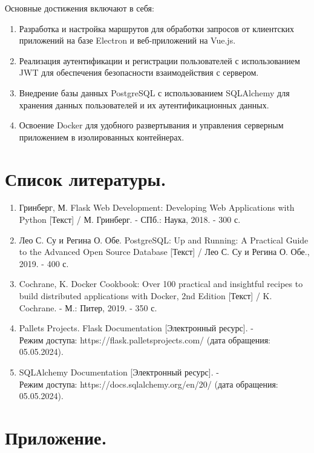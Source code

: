 \documentclass[12pt, russian]{extarticle}
\begin{document}
\begin{spacing}{1.5}
    Основные достижения включают в себя:

    \begin{enumerate}
        \item Разработка и настройка маршрутов для обработки запросов от клиентских приложений
            на базе Electron и веб-приложений на Vue.js.
        \item Реализация аутентификации и регистрации пользователей с использованием JWT
            для обеспечения безопасности взаимодействия с сервером.
        \item Внедрение базы данных PostgreSQL с использованием SQLAlchemy для хранения
            данных пользователей и их аутентификационных данных.
        \item Освоение Docker для удобного развертывания и управления серверным приложением
            в изолированных контейнерах.
    \end{enumerate}

    \newpage
    \section{Список литературы.}

    \begin{enumerate}
        \item Гринберг, М. Flask Web Development: Developing Web Applications with Python [Текст] / М. Гринберг. - СПб.: Наука, 2018. - 300 с.
        \item Лео С. Су и Регина О. Обе. PostgreSQL: Up and Running: A Practical Guide to the Advanced Open Source Database [Текст] / Лео С. Су и Регина О. Обе., 2019. - 400 с.
        \item Cochrane, K. Docker Cookbook: Over 100 practical and insightful recipes to build distributed applications with Docker, 2nd Edition [Текст] / K. Cochrane. - М.: Питер, 2019. - 350 с.
        \item Pallets Projects. Flask Documentation [Электронный ресурс]. - \\
            Режим доступа: https://flask.palletsprojects.com/ (дата обращения: 05.05.2024).
        \item SQLAlchemy Documentation [Электронный ресурс]. - \\
            Режим доступа: https://docs.sqlalchemy.org/en/20/ (дата обращения: 05.05.2024).
    \end{enumerate}

    \newpage
    \section{Приложение.}

    

    \end{spacing}
\end{document}
